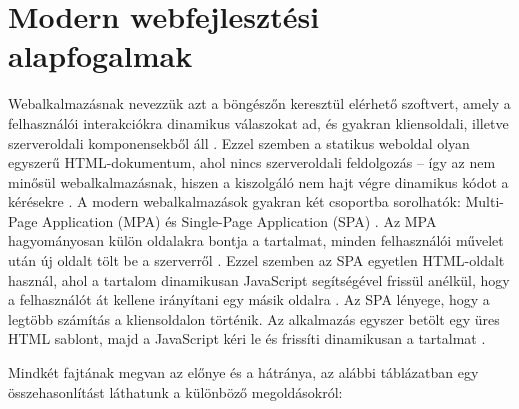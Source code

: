 \section{Modern webfejlesztési alapfogalmak}
Webalkalmazásnak nevezzük azt a böngészőn keresztül elérhető szoftvert, amely a felhasználói interakciókra dinamikus válaszokat ad, és gyakran kliensoldali, illetve szerveroldali komponensekből áll \cite{techtargetWebApplication,mdnClientServerOverview}. Ezzel szemben a statikus weboldal olyan egyszerű HTML-dokumentum, ahol nincs szerveroldali feldolgozás – így az nem minősül webalkalmazásnak, hiszen a kiszolgáló nem hajt végre dinamikus kódot a kérésekre \cite{mdnWebServer,mdnServerSideIntro}. A modern webalkalmazások gyakran két csoportba sorolhatók: Multi-Page Application (MPA) és Single-Page Application (SPA) \cite{webdevPwaArchitecture}. Az MPA hagyományosan külön oldalakra bontja a tartalmat, minden felhasználói művelet után új oldalt tölt be a szerverről \cite{webdevPwaArchitecture}. Ezzel szemben az SPA egyetlen HTML-oldalt használ, ahol a tartalom dinamikusan JavaScript segítségével frissül anélkül, hogy a felhasználót át kellene irányítani egy másik oldalra \cite{mdnSpa}. Az SPA lényege, hogy a legtöbb számítás a kliensoldalon történik. Az alkalmazás egyszer betölt egy üres HTML sablont, majd a JavaScript kéri le és frissíti dinamikusan a tartalmat \cite{mdnSpa,webdevPwaArchitecture}.

Mindkét fajtának megvan az előnye és a hátránya, az alábbi táblázatban egy összehasonlítást láthatunk a különböző megoldásokról:


